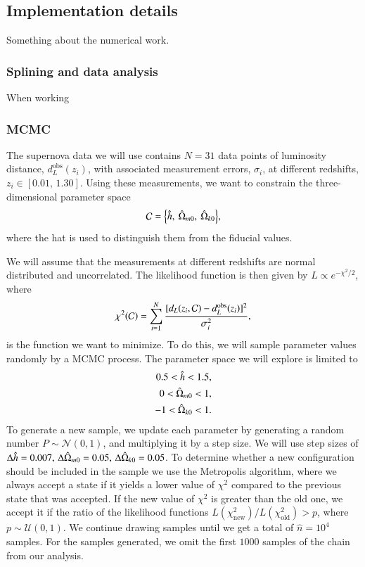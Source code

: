 
\subsection{Implementation details}\label{M1:implementation} 
Something about the numerical work.
\subsubsection{Splining and data analysis }
When working 

\subsubsection{MCMC }
The supernova data we will use contains $N=31$ data points of luminosity distance, $d_L^\mathrm{obs}(z_i)$, with associated measurement errors, $\sigma_i$, at different redshifts, $z_i\in[0.01,\,1.30]$. Using these measurements, we want to constrain the three-dimensional parameter space 
\begin{equation}
    \mathcal{C} = \Big\{ \hat{h},\: \hat{\Omega}_{m0},\: \hat{\Omega}_{k0} \Big\}, \label{eq:M1:implementations:supernova_parameter_space}
\end{equation}  
where the hat is used to distinguish them from the fiducial values.   

We will assume that the measurements at different redshifts are normal distributed and uncorrelated. The likelihood function is then given by $L\propto e^{-\chi^2/2}$, where 
\begin{equation}
    \chi^2(\mathcal{C}) = \sum_{i=1}^N \frac{[d_L(z_i, \mathcal{C}) - d_L^\mathrm{obs}(z_i)]^2}{\sigma_i^2}, \label{eq:M1:implementations:chi2_supernova_data}
\end{equation}
is the function we want to minimize.  To do this, we will sample parameter values randomly by a MCMC process. The parameter space we will explore is limited to  
\begin{equation} \label{eq:M1:implementations:supernova_parameter_ranges}
    \begin{split}
        0.5 < \hat{h} < 1.5, \\
        0 < \hat{\Omega}_{m0} < 1, \\
        -1 < \hat{\Omega}_{k0} < 1.
    \end{split}
\end{equation}   
To generate a new sample, we update each parameter by generating a random number $P\sim\mathcal{N}(0,1)$, and multiplying it by a step size. We will use step sizes of $\Delta \hat{h} = 0.007,\,\Delta \hat{\Omega}_{m0}=0.05,\,\Delta\hat{\Omega}_{k0}=0.05$. To determine whether a new configuration should be included in the sample we use the Metropolis algorithm, where we always accept a state if it yields a lower value of $\chi^2$ compared to the previous state that was accepted. If the new value of $\chi^2$ is greater than the old one, we accept it if the ratio of the likelihood functions $L(\chi^2_\mathrm{new})/L(\chi^2_\mathrm{old})>p$, where $p\sim\mathcal{U}(0,1)$. We continue drawing samples until we get a total of $\hat{n}=10^4$ samples. For the samples generated, we omit the first $1000$ samples of the chain from our analysis.   

